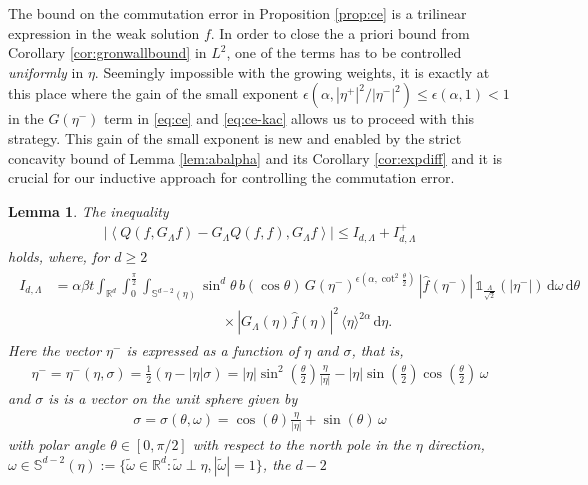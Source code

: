 \documentclass[11pt,a4paper,reqno]{amsart}
\theoremstyle{plain}
\newtheorem{lemma}[proposition]{Lemma}
\theoremstyle{definition}
\begin{document}
The bound on the commutation error in Proposition \ref{prop:ce} is a trilinear expression in the weak solution $f$. In order to close the a priori bound from Corollary \ref{cor:gronwallbound} in $L^2$, one of the terms has to be controlled \emph{uniformly} in $\eta$. Seemingly impossible with the growing weights, it is exactly at this place where the gain of the small exponent $\epsilon(\alpha, |\eta^+|^2/ |\eta^-|^2)\le \epsilon(\alpha,1)<1$ in the $G(\eta^-)$ term in \eqref{eq:ce} and \eqref{eq:ce-kac} allows us to proceed with this strategy.
This gain of the small exponent is new and enabled by the strict concavity bound of Lemma \ref{lem:abalpha} and its Corollary \ref{cor:expdiff} and it is crucial for our inductive approach for controlling the commutation error.	

\begin{lemma}\label{lem:ce} The inequality
	\begin{align*}
		\left| \left\langle Q(f, G_{\Lambda}f) - G_{\Lambda} Q(f,f), G_{\Lambda}f\right\rangle\right|
		\le I_{d,\Lambda} + I_{d,\Lambda}^+
	\end{align*}
	holds, where, for $d\ge 2$
	\begin{align}\label{eq:Id}
	\begin{split}
		I_{d,\Lambda} &= \alpha \beta t \int_{{\mathbb{R}}^d}\int_{0}^{\tfrac{\pi}{2}}  \int_{{\mathbb{S}}^{d-2}(\eta)} \sin^{d}\theta \, b(\cos\theta)\, G(\eta^-)^{\epsilon\left(\alpha, \cot^2\tfrac{\theta}{2}\right)}\,|\hat{f}(\eta^-)| \, {\mathds{1}}_{\tfrac{\Lambda}{\sqrt{2}}}(|\eta^-|) \,\mathrm{d}\omega\,\mathrm{d}\theta\\
		&\qquad \qquad \qquad \qquad \qquad \qquad \times |G_{\Lambda}(\eta) \hat{f}(\eta)|^2 \,\langle \eta \rangle^{2\alpha}\,\mathrm{d}\eta.
	\end{split}
	\end{align}
	Here the vector $\eta^-$ is expressed as a function of $\eta$ and $\sigma$, that is,
	\begin{align}\label{eq:etapar}
		\eta^-= \eta^-(\eta,\sigma) = \frac{1}{2}(\eta - |\eta|\sigma)
			= |\eta|\sin^2(\tfrac{\theta}{2}) \frac{\eta}{|\eta|} - |\eta| \sin (\tfrac{\theta}{2}) \cos (\tfrac{\theta}{2}) \,\omega
	\end{align}
	and $\sigma$ is is a vector on the unit sphere given by
	\begin{align}\label{eq:sigmaeta}
		\sigma = \sigma(\theta,\omega)=\cos(\theta) \frac{\eta}{|\eta|} + \sin (\theta)\, \omega
	\end{align}
	with polar angle $\theta \in [0,\pi/2]$ with respect to the north pole in the $\eta$ direction, $\omega\in {\mathbb{S}}^{d-2}(\eta):= \{ \widetilde{\omega}\in {\mathbb{R}}^d: \widetilde{\omega} \perp \eta, |\widetilde{\omega}|=1  \}$, the $d-2$

\end{lemma}
\end{document}
